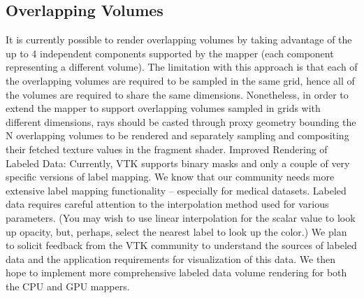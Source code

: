 \subsection{Overlapping Volumes}
It is currently possible to render overlapping volumes by taking advantage of the up to 4 independent components supported by the mapper (each component representing a different volume).  The limitation with this approach is that each of the overlapping volumes are required to be sampled in the same grid, hence all of the volumes are required to share the same dimensions.  Nonetheless, in order to extend the mapper to support overlapping volumes sampled in grids with different dimensions, rays should be casted through proxy geometry bounding the N overlapping volumes to be rendered and separately sampling and compositing their fetched texture values in the fragment shader.
Improved Rendering of Labeled Data: Currently, VTK supports binary masks and only a couple of very specific versions of label mapping. We know that our community needs more extensive label mapping functionality – especially for medical datasets. Labeled data requires careful attention to the interpolation method used for various parameters. (You may wish to use linear interpolation for the scalar value to look up opacity, but, perhaps, select the nearest label to look up the color.) We plan to solicit feedback from the VTK community to understand the sources of labeled data and the application requirements for visualization of this data. We then hope to implement more comprehensive labeled data volume rendering for both the CPU and GPU mappers.